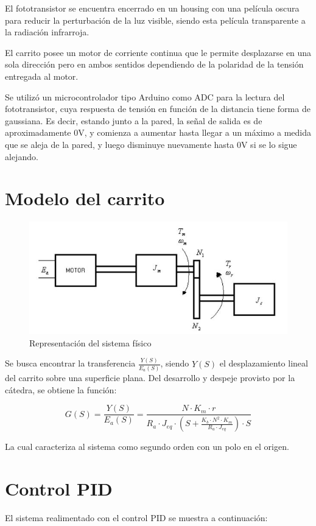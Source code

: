 \documentclass{article}
\begin{document}
El fototransistor se encuentra encerrado en un housing con una película oscura para reducir la perturbación de la luz visible, siendo esta película transparente a la radiación infrarroja.

El carrito posee un motor de corriente continua que le permite desplazarse en una sola dirección pero en ambos sentidos dependiendo de la polaridad de la tensión entregada al motor.

Se utilizó un microcontrolador tipo Arduino como ADC para la lectura del fototransistor, cuya respuesta de tensión en función de la distancia tiene forma de gaussiana. Es decir, estando junto a la pared, la señal de salida es de aproximadamente 0V, y comienza a aumentar hasta llegar a un máximo a medida que se aleja de la pared, y luego disminuye nuevamente hasta 0V si se lo sigue alejando.

\section{Modelo del carrito}

\begin{figure}[H]
\centering
\includegraphics[width=0.7\linewidth]{images/SistemaFisico.JPG}
\caption{Representación del sistema físico}
\label{fig:carrito}
\end{figure}
Se busca encontrar la transferencia $\frac{Y(S)}{E_a(S)}$, siendo $Y(S)$ el desplazamiento lineal del carrito sobre una superficie plana. Del desarrollo y despeje provisto por la cátedra, se obtiene la función:

\[
G(S) = \frac{Y(S)}{E_a(S)} = \frac{N \cdot K_m \cdot r}{R_a \cdot J_{eq} \cdot \left( S + \frac{K_b \cdot N^2 \cdot K_m}{R_a \cdot J_{eq}} \right) \cdot S}
\]

La cual caracteriza al sistema como segundo orden con un polo en el origen.

\newpage
\section{Control PID}

El sistema realimentado con el control PID se muestra a continuación:
\end{document}
